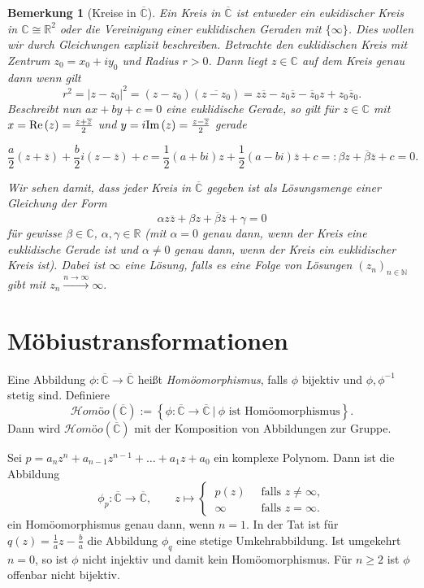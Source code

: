 \documentclass[11pt]{book}
\numberwithin{dummy}{section}
\newtheorem{remark}[theorem]{Bemerkung}
\theoremstyle{nonumberbreak}
\newenvironment{ex}[1][]{\ifthenelse{\equal{#1}{}}{\example}{\example[#1]}\rm}{\endexample}
\newcommand{\Imm}{\mathrm{Im}\hspace{1.5pt}}
\newcommand{\Ree}{\mathrm{Re}\hspace{1.5pt}}
\newcommand{\C}{\mathbb{C}}
\newcommand{\N}{\mathbb{N}}
\newcommand{\CC}{\overline{\mathbb{C}}}
\newcommand{\la}{\longrightarrow}
\newcommand{\homoecc}{\mathcal{H}\textit{omöo}(\CC)}
\begin{document}
\begin{spacing}{1.4}
\begin{remark}[Kreise in $\CC$]
Ein Kreis in $\CC$ ist entweder ein eukidischer Kreis in $\C \cong \mathbb{R}^2$ oder die Vereinigung einer euklidischen Geraden mit $\{\infty\}$. Dies wollen wir durch Gleichungen explizit beschreiben.
Betrachte den euklidischen Kreis mit Zentrum $z_0=x_0 + i y_0$ und Radius $r >0$. Dann liegt $z \in \C$ auf dem Kreis genau dann wenn gilt 
$$r^2= \vert z-z_0\vert^2 = (z-z_0)(\overline{z-z_0}) = z\overline{z} - z_0\overline{z}- \overline{z}_0z + z_0 \overline{z}_0.$$
Beschreibt nun $ax+by+c=0$ eine euklidische Gerade, so gilt für $z \in \C$ mit $x= \Ree(z)= \frac{z+\overline{z}}{2}$ und $y=i\Imm(z)=\frac{z-\overline{z}}{2}$ gerade

$$\frac{a}{2}(z + \overline{z}) + \frac{b}{2} i (z-\overline{z}) + c=\frac{1}{2}(a+bi)z + \frac{1}{2}(a-bi)\overline{z} + c =: \beta z + \overline{\beta} \overline{z} + c =0.$$

Wir sehen damit, dass jeder Kreis in $\CC$ gegeben ist als Lösungsmenge einer Gleichung der Form 
$$\alpha z \overline{z} + \beta z + \overline{\beta} \overline{z} + \gamma = 0$$
für gewisse $\beta \in \C$, $\alpha, \gamma \in \mathbb{R}$ (mit $\alpha=0$ genau dann, wenn der Kreis eine euklidische Gerade ist und $\alpha\neq0$ genau dann, wenn der Kreis ein euklidischer Kreis ist). Dabei ist $\infty$ eine Lösung, falls es eine Folge von Lösungen $(z_n)_{n \in \N}$ gibt mit $z_n \xrightarrow{n \to \infty} \infty.$

\end{remark}





\section{Möbiustransformationen} %




Eine Abbildung $\phi: \CC \la \CC$ heißt \textit{Homöomorphismus}, falls $\phi$ bijektiv und $\phi, \phi^{-1}$ stetig sind. Definiere
$$\homoecc := \left\{ \phi: \CC \la \CC \ \vert \ \phi \textrm{ ist Homöomorphismus} \right\}.$$
Dann wird $\homoecc$ mit der Komposition von Abbildungen zur Gruppe.

\hypertarget{beispieleinszweieins}{}
\begin{ex} Sei $p=a_nz^n+a_{n-1}z^{n-1} + \ldots + a_1z + a_0$ ein komplexe Polynom. Dann ist die Abbildung
$$\phi_p: \CC \la \CC, \qquad z \mapsto \begin{cases} \ p(z) & \ \textrm{ falls } z \neq \infty, \\ \ \infty & \ \textrm{ falls } z=\infty. \end{cases}$$
ein Homöomorphismus genau dann, wenn $n=1$. In der Tat ist für $q(z)=\frac{1}{a}z-\frac{b}{a}$ die Abbildung $\phi_q$ eine stetige Umkehrabbildung. Ist umgekehrt $n=0$, so ist $\phi$ nicht injektiv und damit kein Homöomorphismus. Für $n \geqslant 2$ ist $\phi$ offenbar nicht bijektiv.
\end{ex}


\end{spacing}
\end{document}
